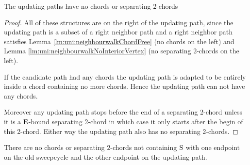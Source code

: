     \begin{lemma}
      The updating paths have no chords or separating $2$-chords
      \label{lm:sweep:augNoIregularity}
    \end{lemma}
    \begin{proof}
        All of these structures are on the right of the updating path, since the updating path is a subset of a right neighbor path and a right neighbor path satisfies Lemma \ref{lm:uni:neighbourwalkChordFree} (no chords on the left) and Lemma \ref{lm:uni:neighbourwalkNoInteriorVertex} (no separating 2-chords on the left).

        If the candidate path had any chords the updating path is adapted to be entirely inside a chord containing no more chords. Hence the updating path can not have any chords.

        Moreover any updating path stops before the end of a separating 2-chord unless it is a $\mathrm{E}$-bound separating 2-chord in which case it only starts after the begin of this 2-chord. Either way the updating path also has no separating 2-chords.
    \end{proof}

    \begin{lemma}
      \label{lm:sweep:noConnectingIregularity}
      There are no chords or separating $2$-chords not containing $\mathrm{S}$ with one endpoint on the old sweepcycle and the other endpoint on the updating path.
    \end{lemma}

